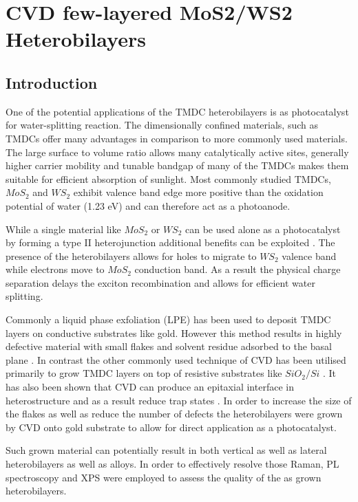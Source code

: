 \chapter{CVD few-layered MoS2/WS2 Heterobilayers}
\label{cha:Heterostructures}

\section{Introduction}

One of the potential applications of the TMDC heterobilayers is as photocatalyst for water-splitting reaction. The dimensionally confined materials, such as TMDCs offer many advantages in comparison to more commonly used materials. The large surface to volume ratio allows many catalytically active sites, generally higher carrier mobility and tunable bandgap of many of the TMDCs makes them suitable for efficient absorption of sunlight. Most commonly studied TMDCs, $MoS_2$ and $WS_2$ exhibit valence band edge more positive than the oxidation potential of water (1.23 eV) and can therefore act as a photoanode. 

While a single material like $MoS_2$ or $WS_2$ can be used alone as a photocatalyst by forming a type II heterojunction additional benefits can be exploited \cite{Chen2016}\cite{Wang2013}. The presence of the heterobilayers allows for holes to migrate to $WS_2$ valence band while electrons move to $MoS_2$ conduction band. As a result the physical charge separation delays the exciton recombination and allows for efficient water splitting. 

Commonly a liquid phase exfoliation (LPE) has been used to deposit TMDC layers on conductive substrates like gold. However this method results in highly defective material with small flakes and solvent residue adsorbed to the basal plane \cite{Yu2017}\cite{Yu2016}\cite{Sivula2016}. In contrast the other commonly used technique of CVD has been utilised primarily to grow TMDC layers on top of resistive substrates like $SiO_2/Si$ \cite{Reale2017}. It has also been shown that CVD can produce an epitaxial interface in heterostructure and as a result reduce trap states \cite{Tan2018}. In order to increase the size of the flakes as well as reduce the number of defects the heterobilayers were grown by CVD onto gold substrate to allow for direct application as a photocatalyst.

Such grown material can potentially result in both vertical as well as lateral heterobilayers as well as alloys. In order to effectively resolve those Raman, PL spectroscopy and XPS were employed to assess the quality of the as grown heterobilayers.

